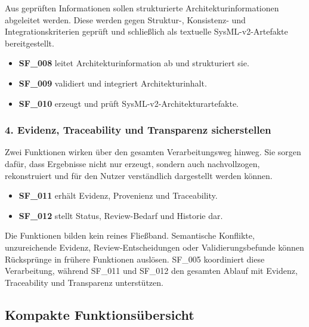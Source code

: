 Aus geprüften Informationen sollen strukturierte Architekturinformationen
abgeleitet werden. Diese werden gegen Struktur-, Konsistenz- und
Integrationskriterien geprüft und schließlich als textuelle SysML-v2-Artefakte
bereitgestellt.

\begin{itemize}[leftmargin=7mm,itemsep=1mm]
  \item \textbf{SF\_008} leitet Architekturinformation ab und strukturiert sie.
  \item \textbf{SF\_009} validiert und integriert Architekturinhalt.
  \item \textbf{SF\_010} erzeugt und prüft SysML-v2-Architekturartefakte.
\end{itemize}

\subsubsection*{4. Evidenz, Traceability und Transparenz sicherstellen}

Zwei Funktionen wirken über den gesamten Verarbeitungsweg hinweg. Sie sorgen
dafür, dass Ergebnisse nicht nur erzeugt, sondern auch nachvollzogen,
rekonstruiert und für den Nutzer verständlich dargestellt werden können.

\begin{itemize}[leftmargin=7mm,itemsep=1mm]
  \item \textbf{SF\_011} erhält Evidenz, Provenienz und Traceability.
  \item \textbf{SF\_012} stellt Status, Review-Bedarf und Historie dar.
\end{itemize}

\begin{tcolorbox}[
  enhanced,
  breakable,
  colback=gray!4,
  colframe=TuringSlate,
  title={Zusammenspiel der Funktionen},
  fonttitle=\bfseries,
  arc=2mm
]
Die Funktionen bilden kein reines Fließband. Semantische Konflikte,
unzureichende Evidenz, Review-Entscheidungen oder Validierungsbefunde können
Rücksprünge in frühere Funktionen auslösen. SF\_005 koordiniert diese
Verarbeitung, während SF\_011 und SF\_012 den gesamten Ablauf mit Evidenz,
Traceability und Transparenz unterstützen.
\end{tcolorbox}
\pagebreak
\subsection{Kompakte Funktionsübersicht}

